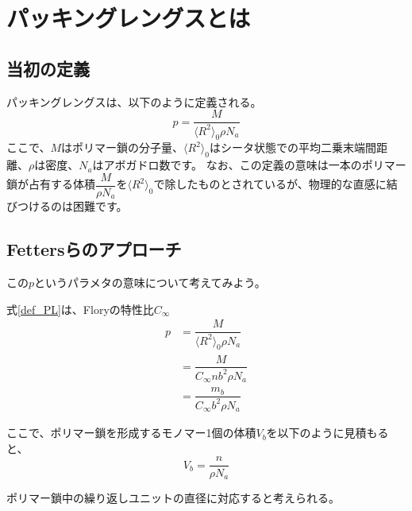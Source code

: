 \documentclass[a4paper,11pt]{jlreq}
\begin{document}
\section{パッキングレングスとは}

\subsection{当初の定義}

パッキングレングスは、以下のように定義される。
\begin{equation}
    p=\dfrac{M}{\langle R^2 \rangle_0 \rho N_a}
    \label{def_PL}
\end{equation}
ここで、$M$はポリマー鎖の分子量、$\langle R^2 \rangle_0$はシータ状態での平均二乗末端間距離、$\rho$は密度、$N_a$はアボガドロ数です。
なお、この定義の意味は一本のポリマー鎖が占有する体積$\dfrac{M}{\rho N_a}$を$\langle R^2 \rangle_0$で除したものとされているが、物理的な直感に結びつけるのは困難です。

\subsection{Fettersらのアプローチ}
この$p$というパラメタの意味について考えてみよう。

式\eqref{def_PL}は、Floryの特性比$C_{\infty}$
\begin{align}
    p&=\dfrac{M}{\langle R^2 \rangle_0 \rho N_a} \\
    &=\dfrac{M}{C_{\infty} n b^2 \rho N_a} \\
    &=\dfrac{m_b}{C_{\infty}b^2\rho N_a}
\end{align}

ここで、ポリマー鎖を形成するモノマー1個の体積$V_b$を以下のように見積もると、
\begin{equation}
    V_b=\dfrac{n}{\rho N_a}
\end{equation}







ポリマー鎖中の繰り返しユニットの直径に対応すると考えられる。
\end{document}
